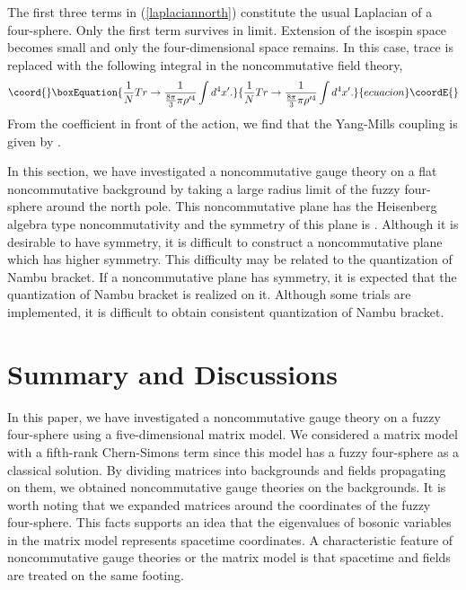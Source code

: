 \documentclass[a4paper,11pt]{article}
\begin{document}
The first three terms in (\ref{laplaciannorth})
constitute the usual Laplacian of a four-sphere. 
Only the first term survives in \myHighlight{$\rho^{\prime} \rightarrow \infty$}\coordHE{}
limit. 
Extension of the isospin space becomes small 
and only the four-dimensional space 
remains. 
In this case, trace is replaced with the following 
integral in the noncommutative field theory, 
\begin{equation}\coord{}\boxEquation{
\frac{1}{N}Tr \rightarrow 
\frac{1}{\frac{8\pi}{3}\pi\rho^{\prime 4}}
\int d^{4}x^{\prime}. 
}{
\frac{1}{N}Tr \rightarrow 
\frac{1}{\frac{8\pi}{3}\pi\rho^{\prime 4}}
\int d^{4}x^{\prime}. 
}{ecuacion}\coordE{}\end{equation}
From the coefficient in front of the action, we find that 
the Yang-Mills coupling is given by 
\coordHE{}.  

\vspace{0.4cm} 

In this section, 
we have investigated a noncommutative gauge theory on a flat noncommutative 
background by taking a large radius limit of the fuzzy four-sphere 
around the north pole. 
This noncommutative plane has the Heisenberg algebra type 
noncommutativity and the symmetry of this plane 
is \coordHE{}. 
Although it is desirable to have \coordHE{} symmetry,  
it is difficult to construct a noncommutative plane 
which has higher symmetry. 
This difficulty may be related to the quantization of 
Nambu bracket\cite{Nambu}. 
If a noncommutative plane has \coordHE{} symmetry, 
it is expected that the quantization of 
Nambu bracket is realized on it. 
Although some trials\cite{ALMY,DFST} 
are implemented, 
it is difficult to obtain consistent quantization of 
Nambu bracket. 





\section{Summary and Discussions}
\hspace{0.4cm}
In this paper, we have investigated 
a noncommutative gauge theory on a fuzzy four-sphere
using a five-dimensional matrix model. 
We considered a matrix model with a fifth-rank Chern-Simons term 
since this model has a fuzzy four-sphere as a classical solution.  
By dividing matrices into backgrounds 
and fields propagating on them, 
we obtained noncommutative gauge theories on the backgrounds. 
It is worth noting that 
we expanded matrices around the coordinates of 
the fuzzy four-sphere. 
This facts supports an idea that the eigenvalues of bosonic variables 
in the matrix model represents spacetime coordinates. 
A characteristic feature of noncommutative gauge theories 
or the matrix model is that 
spacetime and fields are treated on the same footing. 
\end{document}
